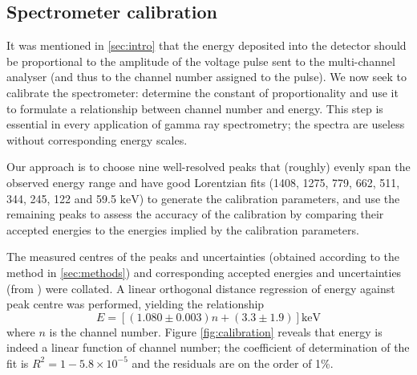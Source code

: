 \documentclass[twocol]{ametsocV6.1}
\begin{document}
\subsection{Spectrometer calibration}\label{sec:calibration}
It was mentioned in \autoref{sec:intro} that
the energy deposited into the detector should be proportional to
the amplitude of the voltage pulse sent to the multi-channel analyser
(and thus to the channel number assigned to the pulse). We now seek to
calibrate the spectrometer:
determine the constant of proportionality and use it to formulate a
relationship between channel number and energy. This step is essential
in every application of gamma ray spectrometry; the spectra are useless
without corresponding energy scales.

Our approach is to choose nine well-resolved peaks that (roughly) evenly
span the observed energy range and have good Lorentzian fits
(1408, 1275, 779, 662, 511, 344, 245, 122 and 59.5 $\si{\kilo\electronvolt}$)
to generate the calibration parameters, and use the remaining peaks to
assess the accuracy of the calibration by comparing their accepted energies
to the energies implied by the calibration parameters.

The measured centres of the peaks and uncertainties (obtained according to the
method in \autoref{sec:methods}) and corresponding accepted energies
and uncertainties (from \cite{heath}) were collated. A linear orthogonal
distance regression of energy against peak centre was performed, yielding
the relationship
\begin{equation}
	E = [(1.080 \pm 0.003) n + (3.3 \pm 1.9)] \si{\kilo\electronvolt}
	\label{eqn:calibration}
\end{equation}
where $n$ is the channel number.
Figure \ref{fig:calibration} reveals that energy is indeed a linear function
of channel number; the coefficient of determination of the fit is
$R^2 = 1 - 5.8\times10^{-5}$ and the residuals are on the order of 1\%.
\end{document}
